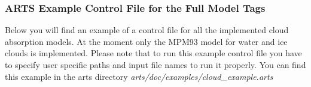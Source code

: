 \subsubsection{ARTS Example Control File for the Full Model Tags}
\label{leveld:ArtsCloudModelExampleControlFile}
Below you will find an example of a control file for all 
the implemented cloud absorption models. At the moment only 
the MPM93 model for water and ice clouds is implemented.
Please note that to run this example control file you 
have to specify user specific paths and input file names 
to run it properly. You can find this example in the 
arts directory {\it arts/doc/examples/cloud\_example.arts}
%
\begin{flushleft}
\end{flushleft}
\begin{flushleft}
\end{flushleft}
\begin{flushleft}
\end{flushleft}




